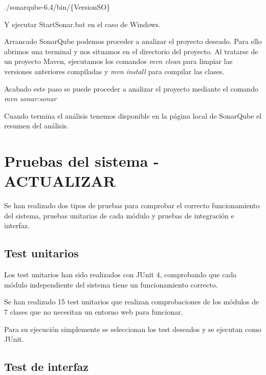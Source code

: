 ./sonarqube-6.4/bin/\{VersionSO\}

Y ejecutar StartSonar.bat en el caso de Windows.


Arrancado SonarQube podemos proceder a analizar el proyecto deseado. Para ello abrimos una terminal y nos situamos en el directorio del proyecto. Al tratarse de un proyecto Maven, ejecutamos los comandos \emph{mvn clean} para limpiar las versiones anteriores compiladas y \emph{mvn install} para compilar las clases.


Acabado este paso se puede proceder a analizar el proyecto mediante el comando \emph{mvn sonar:sonar}


Cuando termina el análisis tenemos disponible en la página local de SonarQube el resumen del análisis.


\section{Pruebas del sistema - ACTUALIZAR}

Se han realizado dos tipos de pruebas para comprobar el correcto funcionamiento del sistema, pruebas unitarias de cada módulo y pruebas de integración e interfaz.

\subsection{Test unitarios}

Los test unitarios han sido realizados con JUnit 4, comprobando que cada módulo independiente del sistema tiene un funcionamiento correcto.

Se han realizado 15 test unitarios que realizan comprobaciones de los módulos de 7 clases que no necesitan un entorno web para funcionar. 


Para su ejecución simplemente se seleccionan los test deseados y se ejecutan como JUnit.


\subsection{Test de interfaz}

